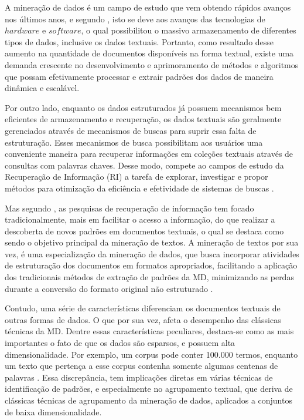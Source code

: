 A mineração de dados é um campo de estudo que vem obtendo rápidos avanços nos últimos anos, e
segundo , isto se deve aos avanços das tecnologias de $hardware$ e
$software$, o qual possibilitou o massivo armazenamento de diferentes tipos de dados, inclusive os
dados textuais. Portanto, como resultado desse aumento na quantidade de documentos disponíveis na
forma textual, existe uma demanda crescente no desenvolvimento e aprimoramento de métodos e
algoritmos que possam efetivamente processar e extrair padrões dos dados de maneira dinâmica e
escalável. 

Por outro lado, enquanto os dados estruturados já possuem mecanismos bem eficientes de armazenamento
e recuperação, os dados textuais são geralmente gerenciados através de mecanismos de buscas para
suprir essa falta de estruturação. Esses mecanismos de busca possibilitam aos usuários uma
conveniente maneira para recuperar informações em coleções textuais através de consultas com palavras
chaves. Desse modo, compete ao campos de estudo da Recuperação de Informação (RI) a tarefa de
explorar, investigar e propor métodos para otimização da eficiência e efetividade de
sistemas de buscas \cite{Baeza2011}. 

Mas segundo , as pesquisas de recuperação de informação tem focado
tradicionalmente, mais em facilitar o acesso a informação, do que realizar a descoberta de novos
padrões em documentos textuais, o qual se destaca como sendo o objetivo principal da mineração de
textos. A mineração de textos por sua vez, é uma especialização da mineração de dados, que busca
incorporar atividades de estruturação dos documentos em formatos apropriados, facilitando a
aplicação dos tradicionais métodos de extração de padrões da MD, minimizando as perdas durante a
conversão do formato original não estruturado \cite{Nogueira2013}.

Contudo, uma série de características diferenciam os documentos textuais de outras formas de dados.
O que por sua vez, afeta o desempenho das clássicas técnicas da MD.  Dentre essas características
peculiares, destaca-se como as mais importantes o fato de que os dados são esparsos, e possuem alta
dimensionalidade. Por exemplo, um corpus pode conter 100.000 termos, enquanto um texto que pertença
a esse corpus contenha somente algumas centenas de palavras \cite{Aggarwal2012}.  Essa discrepância,
tem implicações diretas em várias técnicas de identificação de padrões, e especialmente no
agrupamento textual, que deriva de clássicas técnicas de agrupamento da mineração de dados,
aplicados a conjuntos de baixa dimensionalidade. 


